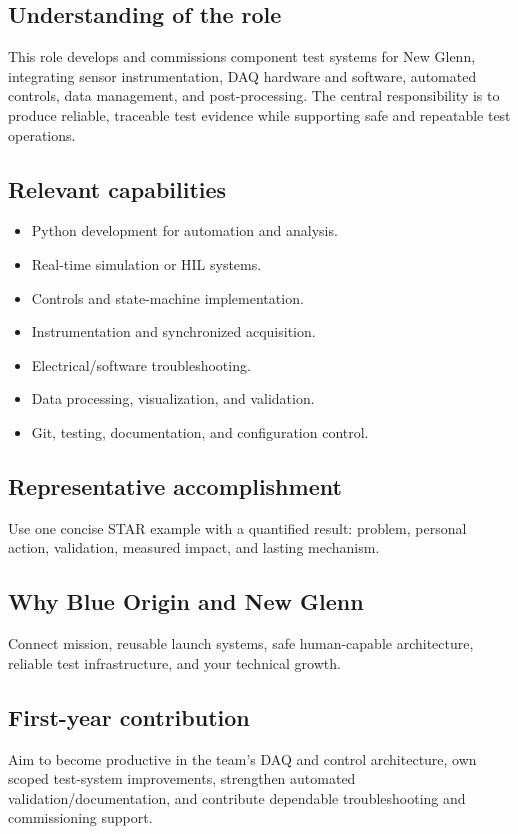\documentclass[11pt]{article}
\begin{document}
\subsection*{Understanding of the role}
This role develops and commissions component test systems for New Glenn,
integrating sensor instrumentation, DAQ hardware and software, automated
controls, data management, and post-processing. The central responsibility is to
produce reliable, traceable test evidence while supporting safe and repeatable
test operations.

\subsection*{Relevant capabilities}
\begin{itemize}
  \item Python development for automation and analysis.
  \item Real-time simulation or HIL systems.
  \item Controls and state-machine implementation.
  \item Instrumentation and synchronized acquisition.
  \item Electrical/software troubleshooting.
  \item Data processing, visualization, and validation.
  \item Git, testing, documentation, and configuration control.
\end{itemize}

\subsection*{Representative accomplishment}
Use one concise STAR example with a quantified result: problem, personal action,
validation, measured impact, and lasting mechanism.

\subsection*{Why Blue Origin and New Glenn}
Connect mission, reusable launch systems, safe human-capable architecture,
reliable test infrastructure, and your technical growth.

\subsection*{First-year contribution}
Aim to become productive in the team's DAQ and control architecture, own scoped
test-system improvements, strengthen automated validation/documentation, and
contribute dependable troubleshooting and commissioning support.
\end{document}
